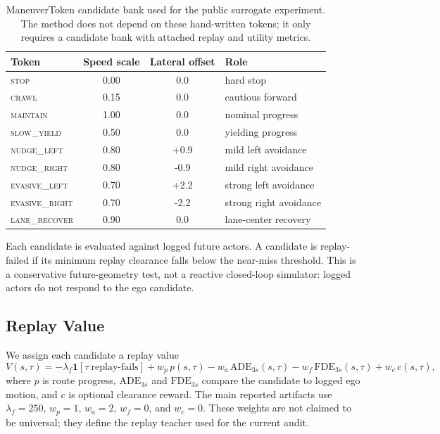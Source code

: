 \documentclass{article}
\newcommand{\token}[1]{\textsc{#1}}
\begin{document}
\begin{table}[t]
\centering
\caption{ManeuverToken candidate bank used for the public surrogate experiment. The method
does not depend on these hand-written tokens; it only requires a candidate bank with
attached replay and utility metrics.}
\label{tab:tokens}
\footnotesize
\begin{tabular}{lccl}
\toprule
Token & Speed scale & Lateral offset & Role \\
\midrule
\token{stop}           & 0.00 & 0.0  & hard stop \\
\token{crawl}          & 0.15 & 0.0  & cautious forward \\
\token{maintain}       & 1.00 & 0.0  & nominal progress \\
\token{slow\_yield}    & 0.50 & 0.0  & yielding progress \\
\token{nudge\_left}    & 0.80 & +0.9 & mild left avoidance \\
\token{nudge\_right}   & 0.80 & -0.9 & mild right avoidance \\
\token{evasive\_left}  & 0.70 & +2.2 & strong left avoidance \\
\token{evasive\_right} & 0.70 & -2.2 & strong right avoidance \\
\token{lane\_recover}  & 0.90 & 0.0  & lane-center recovery \\
\bottomrule
\end{tabular}
\end{table}

Each candidate is evaluated against logged future actors. A candidate is replay-failed if
its minimum replay clearance falls below the near-miss threshold. This is a conservative
future-geometry test, not a reactive closed-loop simulator: logged actors do not respond
to the ego candidate.

\subsection{Replay Value}
\label{sec:method:value}

We assign each candidate a replay value
\begin{equation}
  V(s,\tau) =
  -\lambda_f \mathbf{1}[\tau\ \text{replay-fails}]
  + w_p\,p(s,\tau)
  - w_a\,\mathrm{ADE}_{3s}(s,\tau)
  - w_f\,\mathrm{FDE}_{3s}(s,\tau)
  + w_c\,c(s,\tau),
  \label{eq:value}
\end{equation}
where $p$ is route progress, $\mathrm{ADE}_{3s}$ and $\mathrm{FDE}_{3s}$ compare the
candidate to logged ego motion, and $c$ is optional clearance reward. The main reported
artifacts use $\lambda_f=250$, $w_p=1$, $w_a=2$, $w_f=0$, and $w_c=0$. These weights are
not claimed to be universal; they define the replay teacher used for the current audit.
\end{document}
